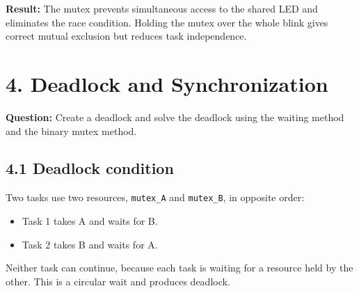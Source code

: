 ﻿\documentclass[12pt,a4paper]{article}
\begin{document}
\textbf{Result:} The mutex prevents simultaneous access to the shared LED and
eliminates the race condition. Holding the mutex over the whole blink gives
correct mutual exclusion but reduces task independence.

\newpage
\section*{4. Deadlock and Synchronization}
\textbf{Question:} Create a deadlock and solve the deadlock using the waiting
method and the binary mutex method.

\subsection*{4.1 Deadlock condition}
Two tasks use two resources, \texttt{mutex\_A} and \texttt{mutex\_B}, in
opposite order:
\begin{itemize}[noitemsep]
    \item Task 1 takes A and waits for B.
    \item Task 2 takes B and waits for A.
\end{itemize}
Neither task can continue, because each task is waiting for a resource held by
the other. This is a circular wait and produces deadlock.
\end{document}
